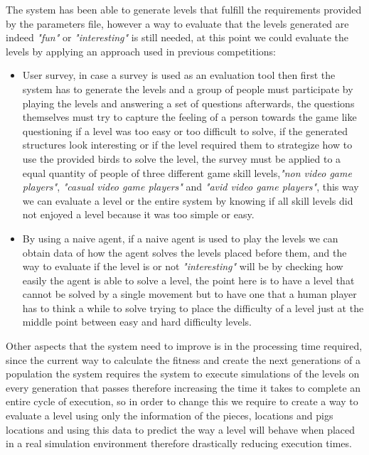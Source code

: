 \documentclass[conference]{IEEEtran}
\begin{document}
     The system has been able to generate levels that fulfill the requirements
     provided by the parameters file, however a way to evaluate that the levels
     generated are indeed \textit{"fun"} or \textit{"interesting"} is still
     needed, at this point we could evaluate the levels by applying an approach
     used in previous competitions:
     \begin{itemize}
        \item User survey, in case a survey is used as an evaluation tool then first
        the system has to generate the levels and a group of people must participate
        by playing the levels and answering a set of questions afterwards, the
        questions themselves must try to capture the feeling of a person towards the
        game like questioning if a level was too easy or too difficult to solve, if
        the generated structures look interesting or if the level required them to
        strategize how to use the provided birds to solve the level, the survey must
        be applied to a equal quantity of people of three different game skill
        levels,\textit{"non video game players"}, \textit{"casual video game
        players"} and \textit{"avid video game players"}, this way we can evaluate a
        level or the entire system by knowing if all skill levels did not enjoyed a
        level because it was too simple or easy.
        \item By using a naive agent, if a naive agent is used to play the levels we
        can obtain data of how the agent solves the levels placed before them, and
        the way to evaluate if the level is or not \textit{"interesting"} will be by
        checking how easily the agent is able to solve a level, the point here is
        to have a level that cannot be solved by a single movement but to have one
        that a human player has to think a while to solve trying to place the
        difficulty of a level just at the middle point between easy and hard
        difficulty levels.
    \end{itemize}
        
    Other aspects that the system need to improve is in the processing time
    required, since the current way to calculate the fitness and create the next
    generations of a population the system requires the system to execute
    simulations of the levels on every generation that passes therefore increasing
    the time it takes to complete an entire cycle of execution, so in order to
    change this we require to create a way to evaluate a level using only the
    information of the pieces, locations and pigs locations and using this data to
    predict the way a level will behave when placed in a real simulation environment
    therefore drastically reducing execution times.
\end{document}
